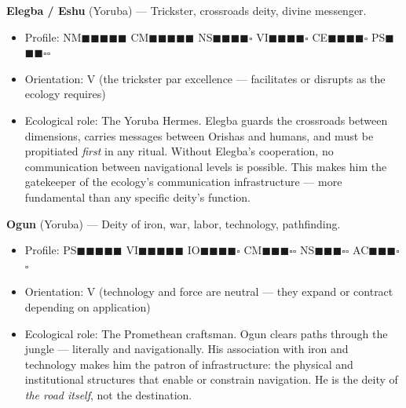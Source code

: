 \textbf{Elegba / Eshu} (Yoruba) — Trickster, crossroads deity, divine messenger.

\begin{itemize}[nosep,leftmargin=*]
  \item Profile: NM$\blacksquare$$\blacksquare$$\blacksquare$$\blacksquare$$\blacksquare$ CM$\blacksquare$$\blacksquare$$\blacksquare$$\blacksquare$$\blacksquare$ NS$\blacksquare$$\blacksquare$$\blacksquare$$\blacksquare$$\square$ VI$\blacksquare$$\blacksquare$$\blacksquare$$\blacksquare$$\square$ CE$\blacksquare$$\blacksquare$$\blacksquare$$\blacksquare$$\square$ PS$\blacksquare$$\blacksquare$$\blacksquare$$\square$$\square$
  \item Orientation: V (the trickster par excellence — facilitates or disrupts as the ecology requires)
  \item Ecological role: The Yoruba Hermes. Elegba guards the crossroads between dimensions, carries messages between Orishas and humans, and must be propitiated \textit{first} in any ritual. Without Elegba's cooperation, no communication between navigational levels is possible. This makes him the gatekeeper of the ecology's communication infrastructure — more fundamental than any specific deity's function.
\end{itemize}


\textbf{Ogun} (Yoruba) — Deity of iron, war, labor, technology, pathfinding.

\begin{itemize}[nosep,leftmargin=*]
  \item Profile: PS$\blacksquare$$\blacksquare$$\blacksquare$$\blacksquare$$\blacksquare$ VI$\blacksquare$$\blacksquare$$\blacksquare$$\blacksquare$$\blacksquare$ IO$\blacksquare$$\blacksquare$$\blacksquare$$\blacksquare$$\square$ CM$\blacksquare$$\blacksquare$$\blacksquare$$\square$$\square$ NS$\blacksquare$$\blacksquare$$\blacksquare$$\square$$\square$ AC$\blacksquare$$\blacksquare$$\blacksquare$$\square$$\square$
  \item Orientation: V (technology and force are neutral — they expand or contract depending on application)
  \item Ecological role: The Promethean craftsman. Ogun clears paths through the jungle — literally and navigationally. His association with iron and technology makes him the patron of infrastructure: the physical and institutional structures that enable or constrain navigation. He is the deity of \textit{the road itself}, not the destination.
\end{itemize}


